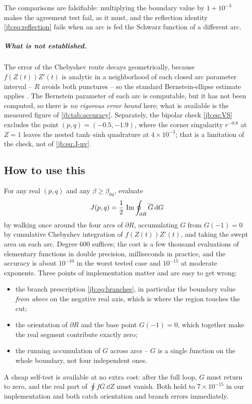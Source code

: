 The comparisons are falsifiable: multiplying the boundary value by $1 + 10^{-3}$ makes the
agreement test fail, as it must, and the reflection identity \eqref{jb:eq:reflection} fails when an arc
is fed the Schwarz function of a different arc.

\subparagraph{What is not established.}
The error of the Chebyshev route decays geometrically, because $f(Z(t)) Z'(t)$ is analytic in a
neighborhood of each closed arc parameter interval -- $R$ avoids both punctures -- so the standard
Bernstein-ellipse estimate applies \cite{Trefethen:2013:ApproximationTheoryPractice}.
The Bernstein parameter of each arc is computable, but it has not been computed, so there is
\emph{no rigorous error bound} here; what is available is the measured figure of
\cref{jb:tab:accuracy}.
Separately, the bipolar check \eqref{jb:eq:VS} excludes the point $(p, q) = (-0.5, -1.9)$, where the
corner singularity $r^{-0.8}$ at $Z = 1$ leaves the nested tanh--sinh quadrature at
$4 \times 10^{-3}$; that is a limitation of the check, not of \eqref{jb:eq:J-uv}.


\subsection{How to use this}
\label{jb:sec:use}


For any real $(p, q)$ and any $\beta \ge \beta_{04}$, evaluate
\begin{equation*}
  J(p, q)
    = \frac12 \, \operatorname{Im} \oint_{\partial R} \overline{G} \, \mathrm{d} G
\end{equation*}
by walking once around the four arcs of $\partial R$, accumulating $G$ from $G(-1) = 0$ by
cumulative Chebyshev integration of $f(Z(t)) Z'(t)$, and taking the swept area on each arc.
Degree $600$ suffices; the cost is a few thousand evaluations of elementary functions in double
precision, milliseconds in practice, and the accuracy is about $10^{-10}$ in the worst tested case
and $10^{-15}$ at moderate exponents.
Three points of implementation matter and are easy to get wrong:

\begin{itemize}
  \setlength{\itemsep}{0.5ex}

  \item the branch prescription \eqref{jb:eq:branches}, in particular the boundary value \emph{from
    above} on the negative real axis, which is where the region touches the cut;

  \item the orientation of $\partial R$ and the base point $G(-1) = 0$, which together make the real
    segment contribute exactly zero;

  \item the running accumulation of $G$ across arcs -- $G$ is a single function on the whole
    boundary, not four independent ones.
\end{itemize}
A cheap self-test is available at no extra cost: after the full loop, $G$ must return to zero, and
the real part of $\oint f \overline{G} \, \dd Z$ must vanish.
Both hold to $7 \times 10^{-15}$ in our implementation and both catch orientation and branch errors
immediately.

